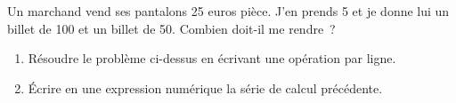\documentclass[exercice]{thedocument}%
\begin{document}
%
\begin{mdframed}
    Un marchand vend ses pantalons 25 euros pièce. J'en prends 5 et je donne lui
un billet de 100 et un billet de 50. Combien doit-il me rendre~?
\end{mdframed}
\begin{enumerate}
    \item Résoudre le problème ci-dessus en écrivant une opération par ligne.\dotedline\dotedline\dotedline\dotedline
    \item Écrire en une expression numérique la série de calcul précédente.\dotedline
\end{enumerate}
\end{document}
